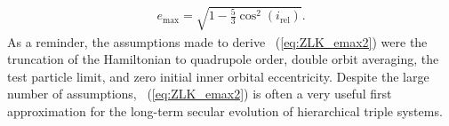 \documentclass[main.tex]{subfiles}
\begin{document}
\begin{tcolorbox}[sharp corners, colback=green!30, colframe=green!80!blue, title=Box \ref{boxchap3:dynVI} -- Orbital dynamics VI (continued)]
{\begin{align}
\label{eq:ZLK_emax2}
e_\mathrm{max} = \sqrt{1-\frac{5}{3}\cos^2 (i_\mathrm{rel})}.
\end{align}
As a reminder, the assumptions made to derive \Eq~(\ref{eq:ZLK_emax2}) were the truncation of the Hamiltonian to quadrupole order, double orbit averaging, the test particle limit, and zero initial inner orbital eccentricity. Despite the large number of assumptions, \Eq~(\ref{eq:ZLK_emax2}) is often a very useful first approximation for the long-term secular evolution of hierarchical triple systems.
}
\end{tcolorbox}
\end{document}
